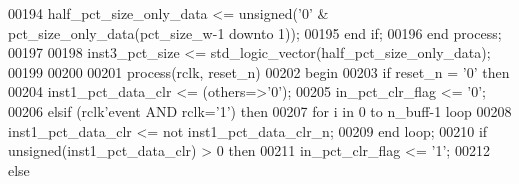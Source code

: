 \begin{DoxyCode}
00194       \textcolor{vhdlchar}{half_pct_size_only_data} \textcolor{vhdlchar}{<=} \textcolor{comment}{unsigned}\textcolor{vhdlchar}{(}\textcolor{vhdlchar}{'}\textcolor{vhdllogic}{}\textcolor{vhdllogic}{0}\textcolor{vhdlchar}{'} \textcolor{vhdlchar}{&} \textcolor{vhdlchar}{pct_size_only_data}\textcolor{vhdlchar}{(}\textcolor{vhdlchar}{pct_size_w}\textcolor{vhdlchar}{-}\textcolor{vhdllogic}{}\textcolor{vhdllogic}{1} \textcolor{keywordflow}{downto} \textcolor{vhdllogic}{}\textcolor{vhdllogic}{1}\textcolor{vhdlchar}{)}\textcolor{vhdlchar}{)};
00195    \textcolor{keywordflow}{end} \textcolor{keywordflow}{if};
00196 \textcolor{keywordflow}{end} \textcolor{keywordflow}{process};
00197 
00198 inst3\_pct\_size <= \textcolor{comment}{std\_logic\_vector}(half\_pct\_size\_only\_data);
00199 
00200 
00201 \textcolor{keywordflow}{process}(rclk, reset_n)
00202 \textcolor{vhdlkeyword}{begin}
00203    \textcolor{keywordflow}{if} \textcolor{vhdlchar}{reset_n} \textcolor{vhdlchar}{=} \textcolor{vhdlchar}{'}\textcolor{vhdllogic}{}\textcolor{vhdllogic}{0}\textcolor{vhdlchar}{'} \textcolor{keywordflow}{then}
00204       inst1\_pct\_data\_clr <= (others=>'0');
00205       \textcolor{vhdlchar}{in_pct_clr_flag} \textcolor{vhdlchar}{<=} \textcolor{vhdlchar}{'}\textcolor{vhdllogic}{}\textcolor{vhdllogic}{0}\textcolor{vhdlchar}{'};
00206    \textcolor{keywordflow}{elsif} \textcolor{vhdlchar}{(}\textcolor{vhdlchar}{rclk}\textcolor{vhdlchar}{'}\textcolor{vhdlkeyword}{event} \textcolor{keywordflow}{AND} \textcolor{vhdlchar}{rclk}\textcolor{vhdlchar}{=}\textcolor{vhdlchar}{'}\textcolor{vhdllogic}{}\textcolor{vhdllogic}{1}\textcolor{vhdlchar}{'}\textcolor{vhdlchar}{)} \textcolor{keywordflow}{then}
00207       \textcolor{keywordflow}{for} \textcolor{vhdlchar}{i} \textcolor{keywordflow}{in} \textcolor{vhdllogic}{}\textcolor{vhdllogic}{0} \textcolor{keywordflow}{to} \textcolor{vhdlchar}{n_buff}\textcolor{vhdlchar}{-}\textcolor{vhdllogic}{}\textcolor{vhdllogic}{1} \textcolor{keywordflow}{loop}
00208          inst1\_pct\_data\_clr <= \textcolor{keywordflow}{not} inst1\_pct\_data\_clr\_n;
00209       \textcolor{keywordflow}{end} \textcolor{keywordflow}{loop}; 
00210       \textcolor{keywordflow}{if} \textcolor{comment}{unsigned}\textcolor{vhdlchar}{(}\textcolor{vhdlchar}{inst1_pct_data_clr}\textcolor{vhdlchar}{)} \textcolor{vhdlchar}{>} \textcolor{vhdllogic}{}\textcolor{vhdllogic}{0} \textcolor{keywordflow}{then} 
00211          \textcolor{vhdlchar}{in_pct_clr_flag} \textcolor{vhdlchar}{<=} \textcolor{vhdlchar}{'}\textcolor{vhdllogic}{}\textcolor{vhdllogic}{1}\textcolor{vhdlchar}{'};
00212       \textcolor{keywordflow}{else} 

\end{DoxyCode}
